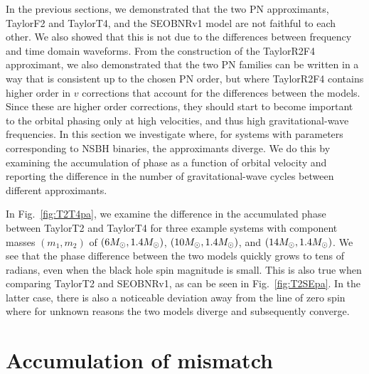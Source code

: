 In the previous sections, we demonstrated that the two \ac{PN} approximants,
TaylorF2 and TaylorT4, and the SEOBNRv1 model are not faithful to each other.
We also showed that this is not due to the differences between frequency and
time domain waveforms.  From the construction of the TaylorR2F4 approximant, we
also demonstrated that the two \ac{PN} families can be written in a way that is
consistent up to the chosen \ac{PN} order, but where TaylorR2F4 contains higher
order in $v$ corrections that account for the differences between the models.
Since these are higher order corrections, they should start to become important
to the orbital phasing only at high velocities, and thus high  gravitational-wave 
frequencies. In this section we investigate where, for systems with parameters
corresponding to \ac{NSBH} binaries, the approximants diverge. We do this by
examining the accumulation of phase as a function of orbital velocity and
reporting the difference in the number of  gravitational-wave  cycles between different
approximants.

In Fig.~\ref{fig:T2T4pa}, we examine the difference in the accumulated phase
between TaylorT2 and TaylorT4 for three example systems with component masses
$(m_1, m_2)$ of $(6M_\odot, 1.4M_\odot)$, $(10M_\odot, 1.4M_\odot)$, and $(14M_\odot,
1.4M_\odot)$. We see that the phase difference between the two models quickly
grows to tens of radians, even when the black hole spin magnitude is small.
This is also true when comparing TaylorT2 and SEOBNRv1, as can be seen in
Fig.~\ref{fig:T2SEpa}.  In the latter case, there is also a noticeable
deviation away from the line of zero spin where for unknown reasons the two
models diverge and subsequently converge.

\section{Accumulation of mismatch}
\label{sec:faithfulness_match_accumulation}


